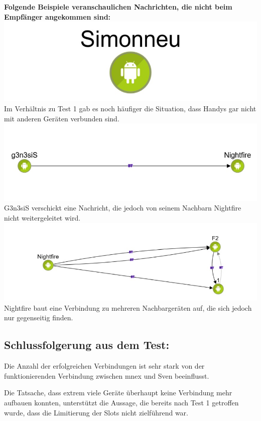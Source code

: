 \textbf{Folgende Beispiele veranschaulichen Nachrichten, die nicht beim
Empfänger angekommen sind:}
\includegraphics[width=1.0\textwidth]{belege/grosstests/Bilder/Grosstest2/Test2Misserfolg1.jpg}
Im Verhältnis zu Test 1 gab es noch häufiger die Situation, dass Handys
gar nicht mit anderen Geräten verbunden sind.
\includegraphics[width=1.0\textwidth]{belege/grosstests/Bilder/Grosstest2/Test2Misserfolg2.jpg}
G3n3siS verschickt eine Nachricht, die jedoch von seinem Nachbarn
Nightfire nicht weitergeleitet wird.
\includegraphics[width=1.0\textwidth]{belege/grosstests/Bilder/Grosstest2/Test2Misserfolg3.jpg}
Nightfire baut eine Verbindung zu mehreren Nachbargeräten auf, die sich
jedoch nur gegenseitig finden.

\clearpage\subsection{Schlussfolgerung aus dem
Test:}\label{schlussfolgerung-aus-dem-test-3}

Die Anzahl der erfolgreichen Verbindungen ist sehr stark von der
funktionierenden Verbindung zwischen mnex und Sven beeinflusst.

Die Tatsache, dass extrem viele Geräte überhaupt keine Verbindung mehr
aufbauen konnten, unterstützt die Aussage, die bereits nach Test 1
getroffen wurde, dass die Limitierung der Slots nicht zielführend war.

